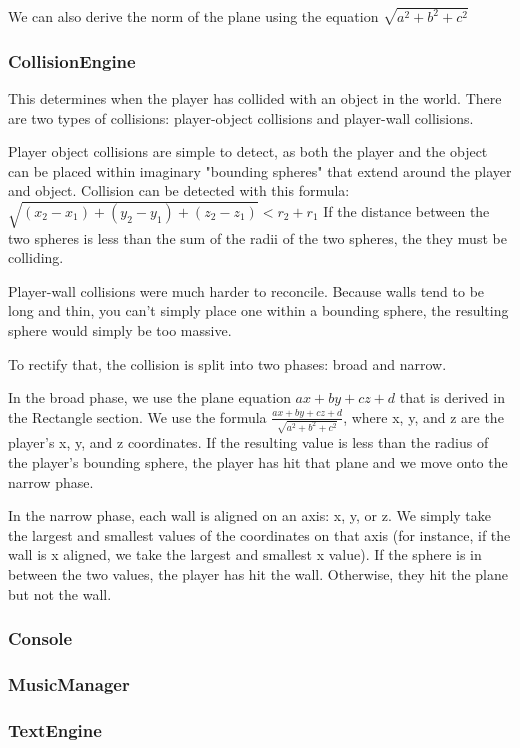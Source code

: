 \documentclass{article}
\begin{document}
We can also derive the norm of the plane using the equation $\sqrt{a^2 + b^2 + c^2}$

\subsubsection{CollisionEngine}
This determines when the player has collided with an object in the world. There are two types of collisions: player-object collisions and player-wall collisions.

Player object collisions are simple to detect, as both the player and the object can be placed within imaginary "bounding spheres" that extend around the player and object. Collision can be detected with this formula:
$\sqrt{(x_2 - x_1) + (y_2 - y_1) + (z_2 - z_1)} < r_2 + r_1$
If the distance between the two spheres is less than the sum of the radii of the two spheres, the they must be colliding.

Player-wall collisions were much harder to reconcile. Because walls tend to be long and thin, you can't simply place one within a bounding sphere, the resulting sphere would simply be too massive.

To rectify that, the collision is split into two phases: broad and narrow.

In the broad phase, we use the plane equation $ax + by + cz + d$ that is derived in the Rectangle section. We use the formula $\frac{ax + by + cz + d}{\sqrt{a^2 + b^2 + c^2}}$, where x, y, and z are the player's x, y, and z coordinates. If the resulting value is less than the radius of the player's bounding sphere, the player has hit that plane and we move onto the narrow phase.

In the narrow phase, each wall is aligned on an axis: x, y, or z. We simply take the largest and smallest values of the coordinates on that axis (for instance, if the wall is x aligned, we take the largest and smallest x value). If the sphere is in between the two values, the player has hit the wall. Otherwise, they hit the plane but not the wall.

\subsubsection{Console}

\subsubsection{MusicManager}

\subsubsection{TextEngine}
\end{document}
